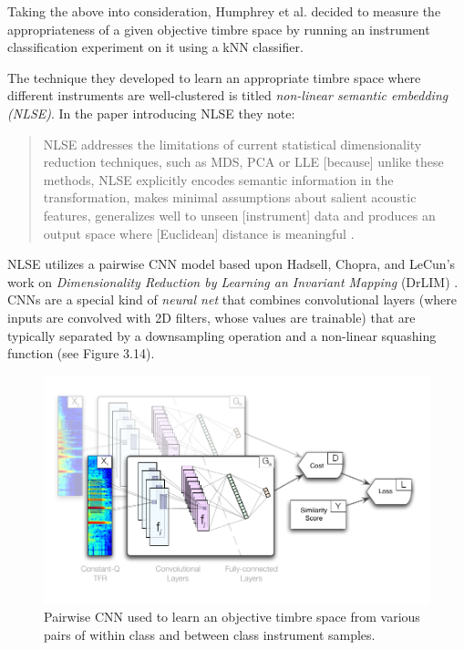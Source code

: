 \documentclass[12pt]{report} 	%
\numberwithin{figure}{chapter}
\numberwithin{table}{chapter}
\numberwithin{equation}{chapter}
\begin{document}
\begin{flushleft}
Taking the above into consideration, Humphrey et al. decided to measure the appropriateness of a given objective timbre space by running an instrument classification experiment on it using a kNN classifier.

The technique they developed to learn an appropriate timbre space where different instruments are well-clustered is titled \textit{non-linear semantic embedding (NLSE)}. In the paper introducing NLSE they note:
\begin{singlespace}
\begin{quote}
NLSE addresses the limitations of current statistical dimensionality reduction techniques, such as MDS, PCA or LLE [because] unlike these methods, NLSE explicitly encodes semantic information in the transformation, makes minimal assumptions about salient acoustic features, generalizes well to unseen [instrument] data and produces an output space where [Euclidean] distance is meaningful \cite[p. 1]{Humphrey:2000th}.
\end{quote}
\end{singlespace}
NLSE utilizes a pairwise CNN model based upon Hadsell, Chopra, and LeCun's work on \textit{Dimensionality Reduction by Learning an Invariant Mapping} (DrLIM) \cite{hadsell2006dimensionality}. CNNs are a special kind of \textit{neural net} that combines convolutional layers (where inputs are convolved with 2D filters, whose values are trainable) that are typically separated by a downsampling operation and a non-linear squashing function (see Figure 3.14). 
\begin{figure}[h!]
\begin{center}
\includegraphics[scale=0.95]{PairwiseCNN}
\caption[Pairwise CNN architecture]{Pairwise CNN used to learn an objective timbre space from various pairs of within class and between class instrument samples.}

\end{center}
\end{figure}
\end{flushleft}
\end{document}
